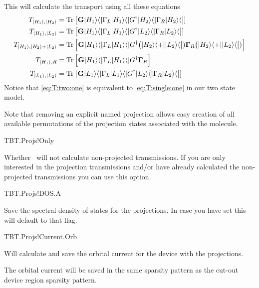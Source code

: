 \bgroup
\def\Gf{\mathbf G}
\def\Gam{\boldsymbol\Gamma}

This will calculate the transport using all these equations
\begin{align}
  \label{eq:T:proj:1}
  T_{\ket{H_1},\ket{H_2}} &=\Tr\big[\Gf\kb{H_1}\Gam_L\kb{H_1}\Gf^\dagger\kb{H_2}\Gam_R\kb{H_2}\big]
  \\
  \label{eq:T:proj:2}
  T_{\ket{H_1},\ket{L_2}} &=\Tr\big[\Gf\kb{H_1}\Gam_L\kb{H_1}\Gf^\dagger\kb{L_2}\Gam_R\kb{L_2}\big]
  \\
  \label{eq:T:two:one}
  T_{\ket{H_1},\ket{H_2}+\ket{L_2}}
  &=\Tr\Big[\Gf\kb{H_1}\Gam_L\kb{H_1}\Gf^\dagger\big(\kb{H_2}+\kb{L_2}\big)\Gam_R\big(\kb{H_2}+\kb{L_2}\big)\Big]
  \\
  \label{eq:T:single:one}
  T_{\ket{H_1},R} &=\Tr\Big[\Gf\kb{H_1}\Gam_L\kb{H_1}\Gf^\dagger\Gam_R\Big]
  \\
  \label{eq:T:proj:5}
  T_{\ket{L_1},\ket{L_2}} &=\Tr\big[\Gf\kb{L_1}\Gam_L\kb{L_1}\Gf^\dagger\kb{L_2}\Gam_R\kb{L_2}\big]
\end{align}
\egroup %
Notice that \ref{eq:T:two:one} is equivalent to \ref{eq:T:single:one}
in our two state model.

Note that removing an explicit named projection allows easy creation
of all available permutations of the projection states associated with
the molecule.


\begin{fdflogicalF}{TBT.Projs!Only}

  Whether \tbtrans\ will not calculate non-projected transmissions. If
  you are only interested in the projection transmissions and/or have
  already calculated the non-projected transmissions you can use this
  option.
  
\end{fdflogicalF}

\begin{fdflogicalF}{TBT.Projs!DOS.A}%

  Save the spectral density of states for the projections. In case you
  have set  this will default to that flag.
  
\end{fdflogicalF}

\begin{fdflogicalF}{TBT.Projs!Current.Orb}%

  Will calculate and save the orbital current for the device with the
  projections.

  The orbital current will be saved in the same sparsity pattern as
  the cut-out device region sparsity pattern. 
  
\end{fdflogicalF}

